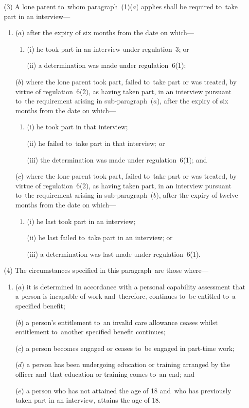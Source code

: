 \documentclass[12pt,a4paper]{article}
\begin{document}
(3) A lone parent to~whom paragraph~(1)($a$)  applies shall be required to~take part in an interview—
\begin{enumerate}\item[]
($a$) after the expiry of six months from the date on which—
\begin{enumerate}\item[]
(i) he took part in an interview under regulation~3; or

(ii) a determination was made under regulation~6(1);
\end{enumerate}

($b$) where the lone parent took part, failed to~take part or was treated, by virtue of regulation~6(2), as having taken part, in an interview pursuant to~the requirement arising in sub-paragraph~($a$), after the expiry of six months from the date on which—
\begin{enumerate}\item[]
(i) he took part in that interview;

(ii) he failed to~take part in that interview; or

(iii) the determination was made under regulation~6(1); and
\end{enumerate}

($c$) where the lone parent took part, failed to~take part or was treated, by virtue of regulation~6(2), as having taken part, in an interview pursuant to~the requirement arising in sub-paragraph~($b$), after the expiry of twelve months from the date on which—
\begin{enumerate}\item[]
(i) he last took part in an interview;

(ii) he last failed to~take part in an interview; or

(iii) a determination was last made under regulation~6(1).
\end{enumerate}
\end{enumerate}

(4) The circumstances specified in this paragraph~are those where—
\begin{enumerate}\item[]
($a$) it is determined in accordance with a personal capability assessment that a person is incapable of work and~therefore, continues to~be entitled to~a specified benefit;

\enlargethispage{-\baselineskip}

($b$) a person’s entitlement to~an invalid care allowance ceases whilst entitlement to~another specified benefit continues;

($c$) a person becomes engaged or ceases to~be engaged in part-time work;

($d$) a person has been undergoing education or training arranged by the officer and~that education or training comes to~an end; and

($e$) a person who has not attained the age of 18 and~who has previously taken part in an interview, attains the age of 18.
\end{enumerate}
\end{document}
